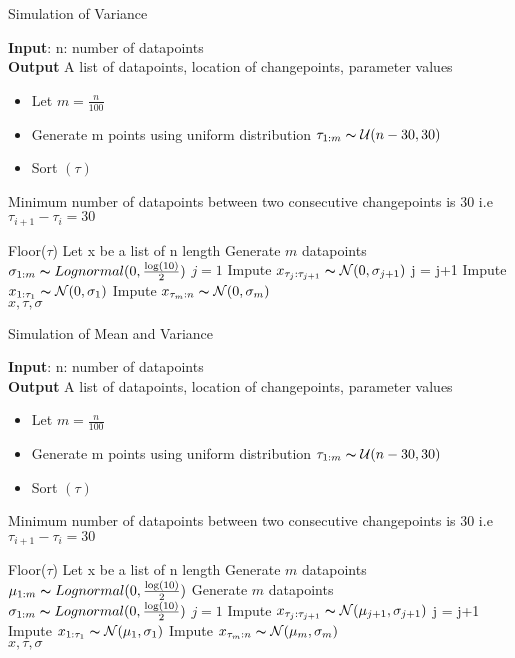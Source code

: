 \documentclass{article}
\newcommand\tab[1][0.4cm]{\hspace*{#1}}
\begin{document}
\begin{algorithm}
\caption{Simulation of Variance}\label{alg:cap}
\textbf{Input}: n: number of datapoints\\
\textbf{Output} A list of datapoints, location of changepoints, parameter values
\begin{algorithmic}
\begin{itemize}
    \item  Let $ m = \frac{n}{100}$
    \item  Generate m points using uniform distribution $\tau_{1:m} \thicksim \mathcal{U} (n-30,30)$ 
    \item  Sort $(\tau)$
\end{itemize}
     \Ensure Minimum number of datapoints between two consecutive changepoints \tab \tab \tab is 30 i.e $\tau_{i+1} - \tau_{i} = 30$ 

\State Floor($\tau$)
\State Let x be a list of n length
\State Generate $m$ datapoints $\sigma_{1:m} \thicksim Lognormal(0,\frac{\log(10)}{2})$
\State $j = 1$
    \State Impute  $x_{\tau_{j} : \tau_{j+1}} \thicksim \mathcal{N}(0,\sigma_{j+1})$
    \State j = j+1
\EndWhile
\State Impute $x_{1:\tau_{1}} \thicksim \mathcal{N}(0,\sigma_{1})$
\State Impute $x_{\tau_{m}:n} \thicksim \mathcal{N}(0,\sigma_{m})$ \\
\Return $x,\tau,\sigma$
\end{algorithmic}
\end{algorithm}

\begin{algorithm}
\caption{Simulation of Mean and Variance}\label{alg:cap}
\textbf{Input}: n: number of datapoints\\
\textbf{Output} A list of datapoints, location of changepoints, parameter values
\begin{algorithmic}
\begin{itemize}
    \item  Let $ m = \frac{n}{100}$
    \item  Generate m points using uniform distribution $\tau_{1:m} \thicksim \mathcal{U} (n-30,30)$ 
    \item  Sort $(\tau)$
\end{itemize}
     \Ensure Minimum number of datapoints between two consecutive changepoints \tab \tab \tab is 30 i.e $\tau_{i+1} - \tau_{i} = 30$ 

\State Floor($\tau$)
\State Let x be a list of n length
\State Generate $m$ datapoints $\mu_{1:m} \thicksim Lognormal(0,\frac{\log(10)}{2})$
\State Generate $m$ datapoints $\sigma_{1:m} \thicksim Lognormal(0,\frac{\log(10)}{2})$
\State $j = 1$
    \State Impute  $x_{\tau_{j} : \tau_{j+1}} \thicksim \mathcal{N}(\mu_{j+1},\sigma_{j+1})$
    \State j = j+1
\EndWhile
\State Impute $x_{1:\tau_{1}} \thicksim \mathcal{N}(\mu_{1},\sigma_{1})$
\State Impute $x_{\tau_{m}:n} \thicksim \mathcal{N}(\mu_{m},\sigma_{m})$ \\
\Return $x,\tau,\sigma$
\end{algorithmic}
\end{algorithm}
\end{document}
